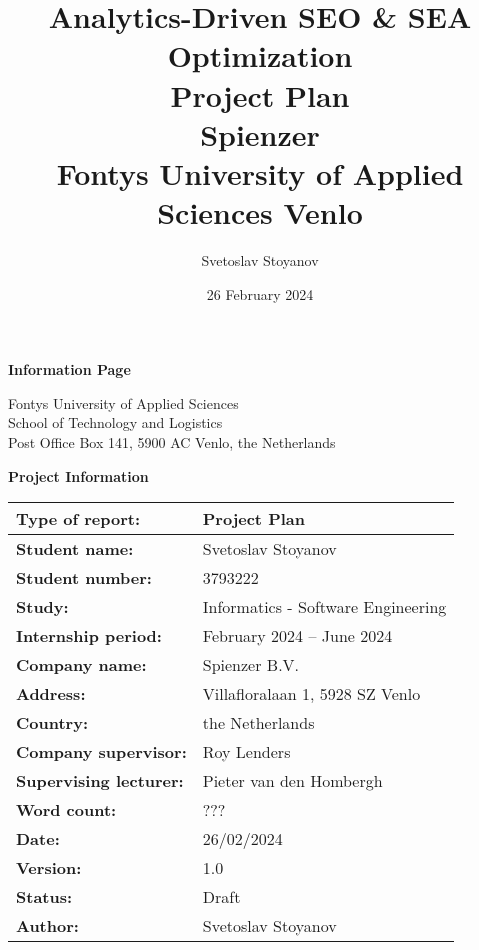 \documentclass[12pt,a4paper]{article}
\title{
    {\Large Analytics-Driven SEO \& SEA Optimization}\\
    {\large Project Plan}\\[1em]
    {\normalsize \textbf{Spienzer}}\\
    {\normalsize Fontys University of Applied Sciences Venlo}
}
\author{Svetoslav Stoyanov}
\date{26 February 2024}
\begin{document}
\maketitle
\newpage
\thispagestyle{empty} %

\maketitle
\newpage
\thispagestyle{empty} %

\begin{center}
    \Large\textbf{Information Page}


Fontys University of Applied Sciences\\

School of Technology and Logistics\\
Post Office Box 141, 5900 AC Venlo, the Netherlands
\end{center}



\begin{center}
    \Large\textbf{Project Information}

\vspace{1em} %

\begin{tabular}{|l|l|} \hline 
    \textbf{Type of report:} & Project Plan \\ \hline 
    \textbf{Student name:} & Svetoslav Stoyanov \\ \hline 
    \textbf{Student number:} & 3793222 \\ \hline 
    \textbf{Study:} & Informatics - Software Engineering \\ \hline 
    \textbf{Internship period:} & February 2024 – June 2024 \\ \hline 
    \textbf{Company name:} & Spienzer B.V. \\ \hline 
    \textbf{Address:} & Villafloralaan 1, 5928 SZ Venlo \\ \hline 
    \textbf{Country:} & the Netherlands \\ \hline 
    \textbf{Company supervisor:} & Roy Lenders \\ \hline 
    \textbf{Supervising lecturer:} & Pieter van den Hombergh \\ \hline 
    \textbf{Word count:} & ??? \\ \hline 
    \textbf{Date:} & 26/02/2024 \\ \hline 
    \textbf{Version:} & 1.0 \\ \hline 
    \textbf{Status:} & Draft \\ \hline 
    \textbf{Author:} & Svetoslav Stoyanov \\ \hline
\end{tabular}
\end{center}
\end{document}
